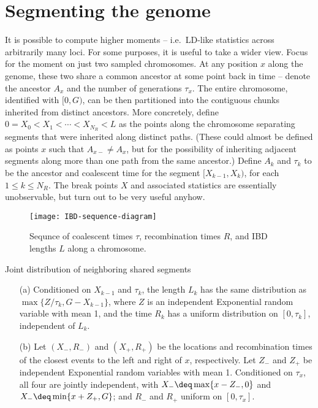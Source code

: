 \section{Segmenting the genome}

It is possible to compute higher moments -- i.e.\ LD-like statistics across arbitrarily many loci.
For some purposes, it is useful to take a wider view.
Focus for the moment on just two sampled chromosomes.
At any position $x$ along the genome, these two share a common ancestor at some point back in time --
denote the ancestor $A_x$ and the number of generations $\tau_x$.
The entire chromosome, identified with $[0,G)$,
can be then partitioned into the contiguous chunks inherited from distinct ancestors.
More concretely, define $0 = X_0 < X_1 < \cdots < X_{N_R} < L$ as the points along the chromosome 
separating segments that were inherited along distinct paths.
(These could almost be defined as points $x$ such that $A_{x-} \neq A_x$,
but for the possibility of inheriting adjacent segments along more than one path from the same ancestor.)
Define $A_k$ and $\tau_k$ to be the ancestor and coalescent time for the segment $[X_{k-1},X_k)$, for each $1 \le k \le N_R$.
The break points $X$ and associated statistics are essentially unobservable,
but turn out to be very useful anyhow.

\begin{figure}[ht]
  \begin{center}
    \texttt{[image: IBD-sequence-diagram]}
  \end{center}
  \caption{
  Sequnce of coalescent times $\tau$, recombination times $R$, and IBD lengths $L$ along a chromosome.
  }
\end{figure}

\begin{lemma}{Joint distribution of neighboring shared segments}
  \begin{enumerate}
      
    \item[(a)] Conditioned on $X_{k-1}$ and $\tau_{k}$, the length $L_k$ has the same distribution as $\max\{Z/\tau_k,G-X_{k-1}\}$,
      where $Z$ is an independent Exponential random variable with mean 1,
      and the time $R_k$ has a uniform distribution on $[0,\tau_k]$, independent of $L_k$.

    \item[(b)] Let $(X_-,R_-)$ and $(X_+,R_+)$ be the locations and recombination times of the closest events
      to the left and right of $x$, respectively.
      Let $Z_-$ and $Z_+$ be independent Exponential random variables with mean 1.
      Conditioned on $\tau_x$, all four are jointly independent,
      with $X_- \deq \max\{ x-Z_-, 0 \}$ and $X_- \deq \min\{ x+Z_+, G \}$;
      and $R_-$ and $R_+$ uniform on $[0,\tau_x]$.

  \end{enumerate}
\end{lemma}

